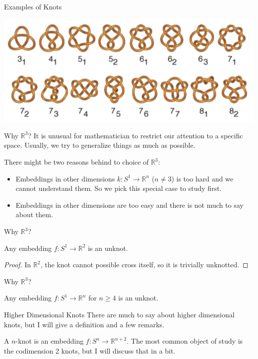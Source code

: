 \documentclass[handout, aspectratio=169]{beamer}
\begin{document}
\begin{frame}{Examples of Knots}
\begin{center}
    \includegraphics[scale=.5]{example.png}
\end{center}
    
\end{frame}

\begin{frame}{Why $\mathbb R^3$?}
    It is unusual for mathematician to restrict our attention to a specific space. Usually, we try to generalize things as much as possible.

    There might be two reasons behind to choice of $\mathbb R^3$:
    \begin{itemize}
        \item Embeddings in other dimensions $k:S^1\rightarrow\mathbb R^n$ ($n\neq 3$) is too hard and we cannot understand them. So we pick this special case to study first.
        \item Embeddings in other dimensions are too easy and there is not much to say about them.
    \end{itemize}
\end{frame}
\begin{frame}{Why $\mathbb R^3$?}
    \begin{theorem}
        Any embedding $f:S^1\rightarrow\mathbb R^2$ is an unknot.
    \end{theorem}
    \begin{proof}
        In $\mathbb R^2$, the knot cannot possible cross itself, so it is trivially unknotted.
    \end{proof}
\end{frame}
\begin{frame}{Why $\mathbb R^3$?}
    \begin{theorem}
        Any embedding $f:S^1\rightarrow\mathbb R^n$ for $n\geq 4$ is an unknot.
    \end{theorem}
    
\end{frame}
\begin{frame}{Higher Dimensional Knots}
    There are much to say about higher dimensional knots, but I will give a definition and a few remarks.

    A $n$-knot is an embedding $f:S^n\rightarrow\mathbb R^{n+2}$. The most common object of study is the codimension 2 knots, but I will discuss that in a bit.
\end{frame}
\end{document}
